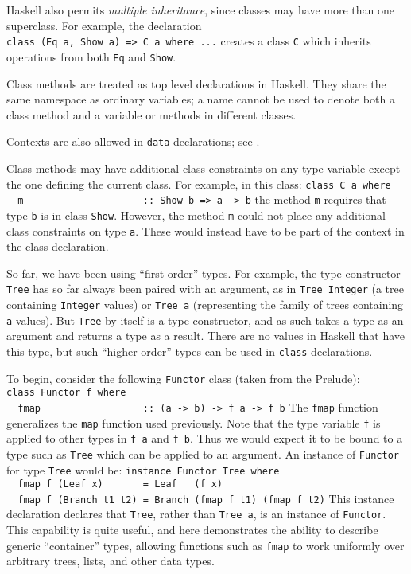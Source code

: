 Haskell also permits {\em multiple inheritance}, since classes may
have more than one superclass.  For example, the declaration
\bprog
\mbox{\tt class\ (Eq\ a,\ Show\ a)\ =>\ C\ a\ where\ ...}
\eprog
creates a class \mbox{\tt C} which inherits operations from both \mbox{\tt Eq} and \mbox{\tt Show}.

Class methods are treated as top level declarations in
Haskell.  They share the same namespace as ordinary variables; a name
cannot be used to denote both a class method and a variable or methods
in different classes.

Contexts are also allowed in \mbox{\tt data} declarations; see .

Class methods may have additional class constraints on any type
variable except the one defining the current class.  For example, in
this class:
\bprog
\mbox{\tt class\ C\ a\ where}\\
\mbox{\tt \ \ m\ \ \ \ \ \ \ \ \ \ \ \ \ \ \ \ \ \ \ \ \ ::\ Show\ b\ =>\ a\ ->\ b}
\eprog
the method \mbox{\tt m} requires that type \mbox{\tt b} is in class \mbox{\tt Show}.  However, the
method \mbox{\tt m} could not place any additional class constraints on type
\mbox{\tt a}.  These would instead have to be part of the context in the class
declaration. 

So far, we have been using ``first-order'' types.  For example, the
type constructor \mbox{\tt Tree} has so far always been paired with an
argument, as in \mbox{\tt Tree\ Integer} (a tree containing \mbox{\tt Integer} values) or
\mbox{\tt Tree\ a} 
(representing the family of trees containing \mbox{\tt a} values).  But \mbox{\tt Tree}
by itself is a type constructor, and as such takes a type as an
argument and returns a type as a result.  There are no values in
Haskell that have this type, but such ``higher-order'' types can be
used in \mbox{\tt class} declarations.

To begin, consider the following \mbox{\tt Functor} class (taken from the Prelude):
\bprog
\mbox{\tt class\ Functor\ f\ where}\\
\mbox{\tt \ \ fmap\ \ \ \ \ \ \ \ \ \ \ \ \ \ \ \ \ \ ::\ (a\ ->\ b)\ ->\ f\ a\ ->\ f\ b}
\eprog
The \mbox{\tt fmap} function generalizes the \mbox{\tt map} function used previously.
Note that the type variable \mbox{\tt f} is applied to other types in \mbox{\tt f\ a} and
\mbox{\tt f\ b}.  Thus we would expect it to be bound to a type such as \mbox{\tt Tree}
which can be applied to an argument.  An instance of \mbox{\tt Functor}
for type \mbox{\tt Tree} would be:
\bprog
\mbox{\tt instance\ Functor\ Tree\ where}\\
\mbox{\tt \ \ fmap\ f\ (Leaf\ x)\ \ \ \ \ \ \ =\ Leaf\ \ \ (f\ x)}\\
\mbox{\tt \ \ fmap\ f\ (Branch\ t1\ t2)\ =\ Branch\ (fmap\ f\ t1)\ (fmap\ f\ t2)}
\eprog
This instance declaration declares that \mbox{\tt Tree}, rather than \mbox{\tt Tree\ a},
is an instance of \mbox{\tt Functor}.  This capability is quite useful, and
here demonstrates the ability to describe generic ``container'' types,
allowing functions such as \mbox{\tt fmap} to work uniformly over arbitrary
trees, lists, and other data types.

